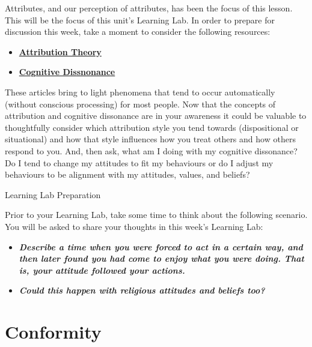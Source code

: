 \documentclass[
]{book}
\providecommand{\tightlist}{%
  \setlength{\itemsep}{0pt}\setlength{\parskip}{0pt}}
\begin{document}
\begin{reflect}
Attributes, and our perception of attributes, has been the focus of this lesson. This will be the focus of this unit's Learning Lab. In order to prepare for discussion this week, take a moment to consider the following resources:

\begin{itemize}
\tightlist
\item
  \href{http://healthyinfluence.com/wordpress/steves-primer-of-practical-persuasion-3-0/thinking/attribution/}{\textbf{Attribution Theory}}\\
\item
  \href{https://www.simplypsychology.org/cognitive-dissonance.html}{\textbf{Cognitive Dissnonance}}
\end{itemize}

These articles bring to light phenomena that tend to occur automatically (without conscious processing) for most people. Now that the concepts of attribution and cognitive dissonance are in your awareness it could be valuable to thoughtfully consider which attribution style you tend towards (dispositional or situational) and how that style influences how you treat others and how others respond to you. And, then ask, what am I doing with my cognitive dissonance? Do I tend to change my attitudes to fit my behaviours or do I adjust my behaviours to be alignment with my attitudes, values, and beliefs?

{Learning Lab Preparation}

Prior to your Learning Lab, take some time to think about the following scenario. You will be asked to share your thoughts in this week's Learning Lab:

\begin{itemize}
\tightlist
\item
  \textbf{\emph{Describe a time when you were forced to act in a certain way, and then later found you had come to enjoy what you were doing. That is, your attitude followed your actions.}}\\
\item
  \textbf{\emph{Could this happen with religious attitudes and beliefs too?}}
\end{itemize}
\end{reflect}

\hypertarget{conformity}{%
\section{Conformity}\label{conformity}}
\end{document}
